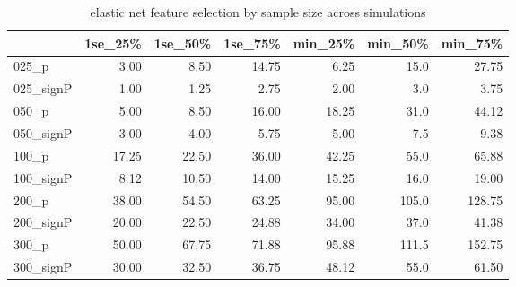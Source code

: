 \documentclass[
]{book}
\begin{document}
\begin{table}

\caption{\label{tab:print-enet-simRes-features-OverSim}elastic net feature selection by sample size across simulations}
\centering
\begin{tabular}[t]{l|r|r|r|r|r|r}
\hline
  & 1se\_25\% & 1se\_50\% & 1se\_75\% & min\_25\% & min\_50\% & min\_75\%\\
\hline
025\_p & 3.00 & 8.50 & 14.75 & 6.25 & 15.0 & 27.75\\
\hline
025\_signP & 1.00 & 1.25 & 2.75 & 2.00 & 3.0 & 3.75\\
\hline
050\_p & 5.00 & 8.50 & 16.00 & 18.25 & 31.0 & 44.12\\
\hline
050\_signP & 3.00 & 4.00 & 5.75 & 5.00 & 7.5 & 9.38\\
\hline
100\_p & 17.25 & 22.50 & 36.00 & 42.25 & 55.0 & 65.88\\
\hline
100\_signP & 8.12 & 10.50 & 14.00 & 15.25 & 16.0 & 19.00\\
\hline
200\_p & 38.00 & 54.50 & 63.25 & 95.00 & 105.0 & 128.75\\
\hline
200\_signP & 20.00 & 22.50 & 24.88 & 34.00 & 37.0 & 41.38\\
\hline
300\_p & 50.00 & 67.75 & 71.88 & 95.88 & 111.5 & 152.75\\
\hline
300\_signP & 30.00 & 32.50 & 36.75 & 48.12 & 55.0 & 61.50\\
\hline
\end{tabular}
\end{table}
\end{document}
